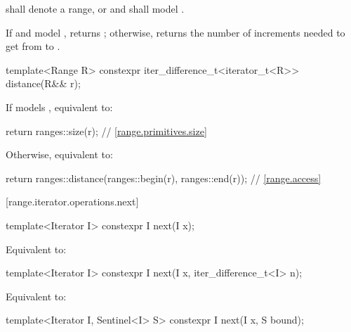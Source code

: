 \begin{addedblock}
\begin{itemdescr}
\pnum
\expects
{} shall denote a range, or
 and  shall model
.

\pnum
\effects
If  and  model ,
returns ;
otherwise, returns the number of increments needed to get from
to
.
\end{itemdescr}

%
\begin{itemdecl}
template<Range R>
  constexpr iter_difference_t<iterator_t<R>> distance(R&& r);
\end{itemdecl}

\begin{itemdescr}
\pnum
\effects
If  models , equivalent to:
\begin{codeblock}
return ranges::size(r); // \ref{range.primitives.size}
\end{codeblock}
Otherwise, equivalent to:
\begin{codeblock}
return ranges::distance(ranges::begin(r), ranges::end(r)); // \ref{range.access}
\end{codeblock}
\end{itemdescr}

[range.iterator.operations.next]{}
%
\begin{itemdecl}
template<Iterator I>
  constexpr I next(I x);
\end{itemdecl}

\begin{itemdescr}
\pnum
\effects Equivalent to: 
\end{itemdescr}

%
\begin{itemdecl}
template<Iterator I>
  constexpr I next(I x, iter_difference_t<I> n);
\end{itemdecl}

\begin{itemdescr}
\pnum
\effects Equivalent to: 
\end{itemdescr}

%
\begin{itemdecl}
template<Iterator I, Sentinel<I> S>
  constexpr I next(I x, S bound);
\end{itemdecl}


\end{addedblock}
